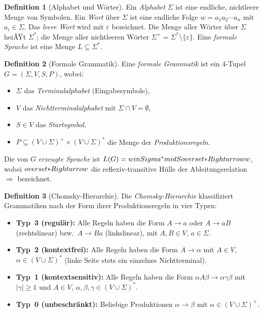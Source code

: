 ﻿\documentclass[a4paper,12pt]{article}
\theoremstyle{definition}
\newtheorem{definition}{Definition}
\begin{document}
\begin{definition}[Alphabet und W\"orter]
Ein \emph{Alphabet} $\Sigma$ ist eine endliche, nichtleere Menge von Symbolen.
Ein \emph{Wort} \"uber $\Sigma$ ist eine endliche Folge $w = a_1 a_2 \cdots a_n$
mit $a_i \in \Sigma$. Das \emph{leere Wort} wird mit $\varepsilon$ bezeichnet.
Die Menge aller W\"orter \"uber $\Sigma$ heiÃŸt $\Sigma^*$; die Menge aller
nichtleeren W\"orter $\Sigma^+ = \Sigma^* \setminus \{\varepsilon\}$.
Eine \emph{formale Sprache} ist eine Menge $L \subseteq \Sigma^*$.
\end{definition}

\begin{definition}[Formale Grammatik]
Eine \emph{formale Grammatik} ist ein 4-Tupel $G = (\Sigma, V, S, P)$, wobei:
\begin{itemize}
    \item $\Sigma$ das \emph{Terminalalphabet} (Eingabesymbole),
    \item $V$ das \emph{Nichtterminalalphabet} mit $\Sigma \cap V = \emptyset$,
    \item $S \in V$ das \emph{Startsymbol},
    \item $P \subseteq (V \cup \Sigma)^+ \times (V \cup \Sigma)^*$
          die Menge der \emph{Produktionsregeln}.
\end{itemize}
Die von $G$ \emph{erzeugte Sprache} ist
$L(G) = \\{w \\in \\Sigma^* \\mid S \\overset{*}{\\Rightarrow} w\\}$,
wobei $\\overset{*}{\\Rightarrow}$ die reflexiv-transitive H\"ulle der Ableitungsrelation
$\Rightarrow$ bezeichnet.
\end{definition}

\begin{definition}[Chomsky-Hierarchie]
\label{def:chomsky}
Die \emph{Chomsky-Hierarchie} klassifiziert Grammatiken nach der Form
ihrer Produktionsregeln in vier Typen:
\begin{itemize}
    \item \textbf{Typ~3 (regul\"ar):} Alle Regeln haben die Form
          $A \to a$ oder $A \to aB$ (rechtslinear) bzw.\ $A \to Ba$
          (linkslinear), mit $A, B \in V$, $a \in \Sigma$.
    \item \textbf{Typ~2 (kontextfrei):} Alle Regeln haben die Form
          $A \to \alpha$ mit $A \in V$, $\alpha \in (V \cup \Sigma)^*$
          (linke Seite stets ein einzelnes Nichtterminal).
    \item \textbf{Typ~1 (kontextsensitiv):} Alle Regeln haben die Form
          $\alpha A \beta \to \alpha \gamma \beta$ mit $|\gamma| \geq 1$
          und $A \in V$, $\alpha, \beta, \gamma \in (V \cup \Sigma)^*$.
    \item \textbf{Typ~0 (unbeschr\"ankt):} Beliebige Produktionen
          $\alpha \to \beta$ mit $\alpha \in (V \cup \Sigma)^+$.
\end{itemize}
\end{definition}
\end{document}
